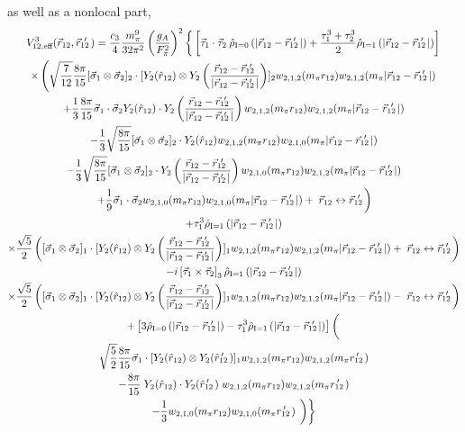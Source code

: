 \documentclass[%
 preprint,
 amsmath,amssymb,
 aps,
]{revtex4-1}
\newcommand{\rhohat}[2]{\hat{\rho}_{\text{I}=#1}\left( #2 \right)}
\newcommand{\rot}{\vec{r}_{12}}
\newcommand{\rotp}{\vec{r}_{12}\!\!\!'\,\,}
\newcommand{\rotpr}{r_{12}\!\!\!\!'\,\,\,}
\newcommand{\rotphat}{\hat{r}_{12}\!\!\!\!'\,\,\,}
\newcommand{\taudot}{\vec{\tau}_1\cdot\vec{\tau}_2}
\newcommand{\taucrossthree}{\left[\vec{\tau}_1\times\vec{\tau}_2\right]_3}
\newcommand{\tauplusthree}{\frac{\tau_1^3+\tau_2^3}{2}}
\newcommand{\sigmadot}{\vec{\sigma}_1\cdot\vec{\sigma}_2}
\newcommand{\sigmatwo}{[\vec{\sigma}_1\otimes\vec{\sigma}_2]_2}
\newcommand{\sigmaone}{[\vec{\sigma}_1\otimes\vec{\sigma}_2]_1}
\newcommand{\fracphantom}{\vphantom{\frac{1}{1}}}
\newcommand{\w}[4]{w_{#1,#2,#3}(#4)}
\begin{document}
as well as a nonlocal part,
\begin{multline}
V^{3}_{12,\text{eff}}(\rot,\rotp)=\frac{c_3 }{4}\frac{m_\pi^9}{32\pi^2}\left(\frac{g_A}{F_\pi^2}\right)^2 \left\{\fracphantom\left[\taudot \:\rhohat{0}{|\rot-\rotp|} +\tauplusthree \rhohat{1}{|\rot-\rotp|} \right]\right. \\
%
\times\left(\sqrt{\frac{7}{12}}\frac{8\pi}{15}\sigmatwo\cdot  [ Y_2(\hat{r}_{12})\otimes Y_2 \left(\frac{\rot-\rotp}{|\rot-\rotp|}\right) ]_2 \w{2}{1}{2}{m_\pi r_{12}}\w{2}{1}{2}{m_\pi |\rot-\rotp|} 
\right.\\ 
%
+\frac{1}{3}\frac{8\pi}{15}\sigmadot Y_2(\hat{r}_{12})\cdot Y_2 \left(\frac{\rot-\rotp}{|\rot-\rotp|}\right)  \w{2}{1}{2}{m_\pi r_{12}}\w{2}{1}{2}{m_\pi |\rot-\rotp|} \\
%
-\frac{1}{3}\sqrt{\frac{8\pi}{15}}\sigmatwo \cdot Y_2(\hat{r}_{12}) \w{2}{1}{2}{m_\pi r_{12}}\w{2}{1}{0}{m_\pi |\rot-\rotp|} \\
-\frac{1}{3}\sqrt{\frac{8\pi}{15}}\sigmatwo \cdot Y_2 \left(\frac{\rot-\rotp}{|\rot-\rotp|}\right) \w{2}{1}{0}{m_\pi r_{12}}\w{2}{1}{2}{m_\pi |\rot-\rotp|} \\
\left.+\frac{1}{9}\sigmadot  \w{2}{1}{0}{m_\pi r_{12}}\w{2}{1}{0}{m_\pi |\rot-\rotp|}+\; \rot \leftrightarrow \rotp \fracphantom\right) \\
%
%
+\tau_1^3 \rhohat{1}{|\rot-\rotp|} \\
\times\frac{\sqrt{5}}{2}\left(\fracphantom  \sigmaone \cdot  [ Y_2(\hat{r}_{12})\otimes Y_2 \left(\frac{\rot-\rotp}{|\rot-\rotp|}\right) ]_1  \w{2}{1}{2}{m_\pi r_{12}}\w{2}{1}{2}{m_\pi |\rot - \rotp|} + \; \rot \leftrightarrow \rotp \fracphantom\right)\\
%
-i\taucrossthree \rhohat{1}{|\rot-\rotp|} \\
\times\frac{\sqrt{5}}{2}\left(\fracphantom \sigmaone \cdot  [ Y_2(\hat{r}_{12})\otimes Y_2 \left(\frac{\rot-\rotp}{|\rot-\rotp|}\right) ]_1  \w{2}{1}{2}{m_\pi r_{12}}\w{2}{1}{2}{m_\pi |\rot-\rotp|} - \; \rot \leftrightarrow \rotp \fracphantom\right) \\
%
%
+\left[3\rhohat{0}{|\rot-\rotp|}-\tau_1^3 \rhohat{1}{|\rot-\rotp|}\right]\left( \fracphantom\right. \\
\sqrt{\frac{5}{2}}\frac{8\pi}{15}  \vec{\sigma}_1 \cdot [Y_2 (\hat{r}_{12}) \otimes Y_2(\rotphat)]_1 \w{2}{1}{2}{m_\pi r_{12}} \w{2}{1}{2}{m_\pi\rotpr}  \\
-\frac{8\pi}{15}\;Y_2 (\hat{r}_{12}) \cdot Y_2(\rotphat) \;\w{2}{1}{2}{m_\pi r_{12}} \w{2}{1}{2}{m_\pi\rotpr} \\
%
-\frac{1}{3} \w{2}{1}{0}{m_\pi r_{12}} \w{2}{1}{0}{m_\pi\rotpr} \left. \left.\fracphantom\right)\right\}
\end{multline}
\end{document}
